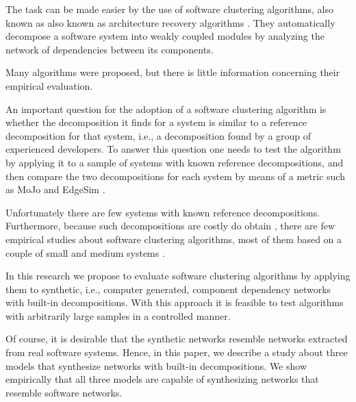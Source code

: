 The task can be made easier by the use of software clustering algorithms, also
known as also known as architecture recovery algorithms \cite{Pollet2007}. They
automatically decompose a software system into weakly coupled modules by
analyzing the network of dependencies between its components.


Many algorithms were proposed, but there is little information concerning their
empirical evaluation.


An important question for the adoption of a software clustering algorithm is
whether the decomposition it finds for a system is similar to a reference
decomposition for that system, i.e., a decomposition found by a group of
experienced developers. To answer this question one needs to test the algorithm
by applying it to a sample of systems with known reference decompositions, and
then compare the two decompositions for each system by means of a metric such as
MoJo \cite{Tzerpos1999} and EdgeSim \cite{Mitchell2001}.

Unfortunately there are few systems with known reference decompositions.
Furthermore, because such decompositions are costly do obtain
\cite{Koschke2000}, there are few empirical studies about software clustering
algorithms, most of them based on a couple of small and medium systems
\cite{Anquetil1999,Maqbool2007,Bittencourt2009}.


In this research we propose to evaluate software clustering algorithms by
applying them to synthetic, i.e., computer generated, component dependency
networks with built-in decompositions. With this approach it is feasible to test
algorithms with arbitrarily large samples in a controlled manner.

Of course, it is desirable that the synthetic networks resemble networks
extracted from real software systems. Hence, in this paper, we describe a study
about three models that synthesize networks with built-in decompositions. We
show empirically that all three models are capable of synthesizing networks that
resemble software networks.

